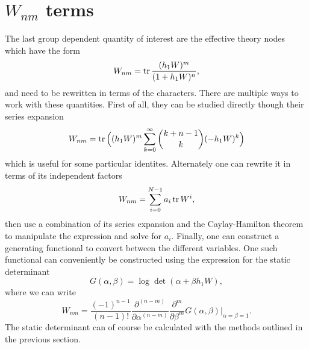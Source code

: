 \section{\texorpdfstring{$W_{nm}$}{Wnm} terms}
\label{sec:evaluating-polyakov-coupling-terms}

The last group dependent quantity of interest are the effective theory nodes
which have the form
%
\begin{equation}
  W_{nm} = \operatorname{tr} \frac{(h_1 W)^m}{(1 + h_1 W)^n},
\end{equation}
%
and need to be rewritten in terms of the characters. There are multiple ways to
work with these quantities. First of all, they can be studied directly though
their series expansion
%
\begin{equation}
  W_{nm} = \operatorname{tr} \Big( (h_1 W)^m \sum_{k=0}^{\infty} \binom{k + n - 1}{k} (-h_1 W)^k \Big)
\end{equation}
%
which is useful for some particular identites. Alternately one can rewrite it in
terms of its independent factors
%
\begin{equation}
  W_{nm} = \sum_{i=0}^{N-1} a_i \operatorname{tr}{W^i},
\end{equation}
%
then use a combination of its series expansion and the Caylay-Hamilton theorem
to manipulate the expression and solve for $a_i$. Finally, one can construct a
generating functional to convert between the different variables. One such
functional can conveniently be constructed using the expression for the static
determinant
%
\begin{equation}
  G(\alpha,\beta) = \log \det ( \alpha + \beta h_1 W ),
\end{equation}
%
where we can write
%
\begin{equation}
  W_{nm} = \frac{(-1)^{n-1}}{(n-1)!} \frac{\partial^{(n-m)}}{\partial \alpha^{(n-m)}}
    \frac{\partial^{m}}{\partial \beta^m} G(\alpha,\beta)
    \bigg|_{\alpha=\beta=1}.
\end{equation}
%
The static determinant can of course be calculated with the methods outlined in
the previous section.
